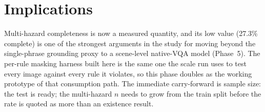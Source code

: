 \section{Implications}

Multi-hazard completeness is now a measured quantity, and its low value (27.3\% complete) is one of the
strongest arguments in the study for moving beyond the single-phrase grounding proxy to a scene-level
native-VQA model (Phase~5). The per-rule masking harness built here is the same one the scale run uses
to test every image against every rule it violates, so this phase doubles as the working prototype of
that consumption path. The immediate carry-forward is sample size: the test is ready; the multi-hazard
$n$ needs to grow from the train split before the rate is quoted as more than an existence result.
